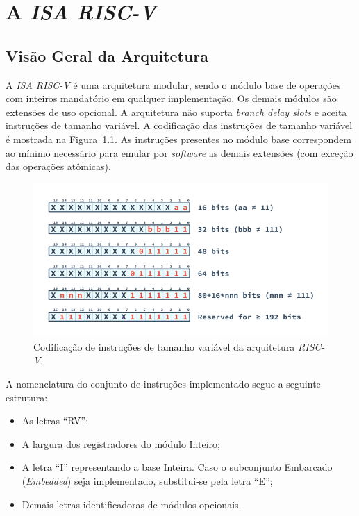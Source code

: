 \chapter{A \textit{ISA RISC-V}}\label{CapISA}


    \section{Visão Geral da Arquitetura}

        {A \textit{ISA RISC-V} é uma arquitetura modular, sendo o módulo base de operações com inteiros mandatório em qualquer implementação. Os demais módulos são extensões de uso opcional. A arquitetura não suporta \textit{branch delay slots} e aceita instruções de tamanho variável. A codificação das instruções de tamanho variável é mostrada na Figura~\ref{fig:riscv_var_length}. As instruções presentes no módulo base correspondem ao mínimo necessário para emular por \textit{software} as demais extensões (com exceção das operações atômicas).}

        \begin{figure}[H]
        \centering
            \includegraphics[width=1\linewidth]{figs/RV_InstructionLength.png}
            \caption{Codificação de instruções de tamanho variável da arquitetura \textit{RISC-V}.}\label{fig:riscv_var_length}
        \end{figure}

        \clearpage

        {A nomenclatura do conjunto de instruções implementado segue a seguinte estrutura:}

        \begin{itemize}[leftmargin=20mm]
            \item {As letras ``RV'';}
            \item {A largura dos registradores do módulo Inteiro;}
            \item {A letra ``I'' representando a base Inteira. Caso o subconjunto Embarcado (\textit{Embedded}) seja implementado, substitui-se pela letra ``E'';}
            \item {Demais letras identificadoras de módulos opcionais.}
        \end{itemize}

